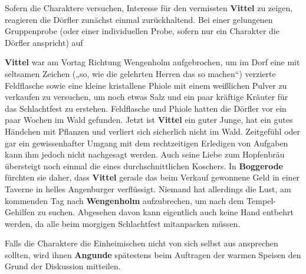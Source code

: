 Sofern die Charaktere versuchen, Interesse für den vermissten \textbf{Vittel} zu zeigen, reagieren die Dörfler zunächst einmal zurückhaltend.
Bei einer gelungenen Gruppenprobe (oder einer individuellen Probe, sofern nur ein Charakter die Dörfler anspricht) auf 

\textbf{Vittel} war am Vortag Richtung Wengenholm aufgebrochen, um im Dorf eine mit seltsamen Zeichen („so, wie die gelehrten Herren das so machen“) verzierte Feldflasche sowie eine kleine kristallene Phiole mit einem weißlichen Pulver zu verkaufen zu versuchen, um noch etwas Salz und ein paar kräftige Kräuter für das Schlachtfest zu erstehen.
Feldflasche und Phiole hatten die Dörfler vor ein paar Wochen im Wald gefunden.
Jetzt ist \textbf{Vittel} ein guter Junge, hat ein gutes Händchen mit Pflanzen und verliert sich sicherlich nicht im Wald.
Zeitgefühl oder gar ein gewissenhafter Umgang mit dem rechtzeitigen Erledigen von Aufgaben kann ihm jedoch nicht nachgesagt werden. 
Auch seine Liebe zum Hopfenbräu übersteigt noch einmal die eines durchschnittlichen Koschers.
In \textbf{Boggerode} fürchten sie daher, dass \textbf{Vittel} gerade das beim Verkauf gewonnene Geld in einer Taverne in helles Angenburger verflüssigt.
Niemand hat allerdings die Lust, am kommenden Tag nach \textbf{Wengenholm} aufzubrechen, um nach dem Tempel-Gehilfen zu suchen.
Abgesehen davon kann eigentlich auch keine Hand entbehrt werden, da alle beim morgigen Schlachtfest mitanpacken müssen.

Falls die Charaktere die Einheimischen nicht von sich selbst aus ansprechen sollten, wird ihnen \textbf{Angunde} spätestens beim Auftragen der warmen Speisen den Grund der Diskussion mitteilen.


